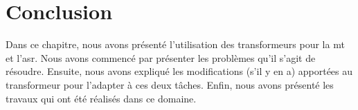 \section{Conclusion}

Dans ce chapitre, nous avons présenté l'utilisation des transformeurs pour la \gls{mt} et l'\gls{asr}.
Nous avons commencé par présenter les problèmes qu'il s'agit de résoudre.
Ensuite, nous avons expliqué les modifications (s'il y en a) 
apportées au transformeur pour l'adapter à ces deux tâches.
Enfin, nous avons présenté les travaux qui ont été réalisés dans ce domaine.